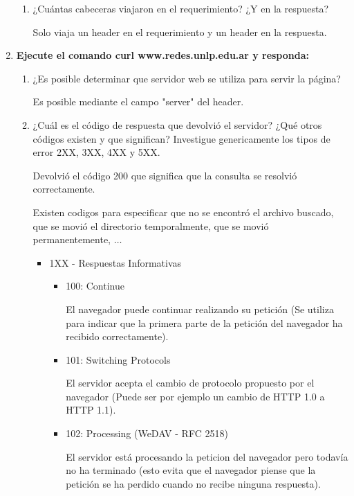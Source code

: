 \documentclass[a4paper,10pt]{article}
\begin{document}
\begin{enumerate}
\begin{enumerate}
            \item ¿Cuántas cabeceras viajaron en el requerimiento? ¿Y en la respuesta?

            Solo viaja un header en el requerimiento y un header en la respuesta.
        \end{enumerate}

    \item \textbf{Ejecute el comando curl www.redes.unlp.edu.ar y responda:}
        \begin{enumerate}
            \item ¿Es posible determinar que servidor web se utiliza para servir la página?

            Es posible mediante el campo "server" del header.

            \item ¿Cuál es el código de respuesta que devolvió el servidor? ¿Qué otros códigos existen y que significan? Investigue genericamente los tipos de error 2XX, 3XX, 4XX y 5XX.

            Devolvió el código 200 que significa que la consulta se resolvió correctamente.

            Existen codigos para especificar que no se encontró el archivo buscado, que se movió el directorio temporalmente, que se movió permanentemente, $\ldots$

                \begin{itemize}
                    \item 1XX - Respuestas Informativas
                        \begin{itemize}
                            \item 100: Continue

                            El navegador puede continuar realizando su petición (Se utiliza para indicar que la primera parte de la petición del navegador ha recibido correctamente).

                            \item 101: Switching Protocols

                            El servidor acepta el cambio de protocolo propuesto por el navegador (Puede ser por ejemplo un cambio de HTTP 1.0 a HTTP 1.1).

                            \item 102: Processing (WeDAV - RFC 2518)

                            El servidor está procesando la peticion del navegador pero todavía no ha terminado (esto evita que el navegador piense que la petición se ha perdido cuando no recibe ninguna respuesta).


\end{itemize}
\end{itemize}
\end{enumerate}
\end{enumerate}
\end{document}
